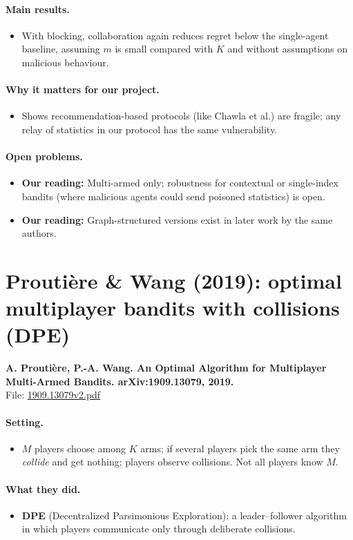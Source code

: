 \documentclass[11pt]{article}
\newcommand{\ours}{\textcolor{orange!80!black}{\textbf{Our reading:}}}
\newcommand{\file}[1]{\url{#1}}
\begin{document}
\paragraph{Main results.}
\begin{itemize}\item With blocking, collaboration again reduces regret below the single-agent baseline, assuming $m$ is small compared with $K$ and without assumptions on malicious behaviour.\end{itemize}
\paragraph{Why it matters for our project.}
\begin{itemize}\item Shows recommendation-based protocols (like Chawla et al.) are fragile; any relay of statistics in our protocol has the same vulnerability.\end{itemize}
\paragraph{Open problems.}
\begin{itemize}\item \ours{} Multi-armed only; robustness for contextual or single-index bandits (where malicious agents could send poisoned statistics) is open.\item \ours{} Graph-structured versions exist in later work by the same authors.\end{itemize}
\section{Proutière \& Wang (2019): optimal multiplayer bandits with collisions (DPE)}
\textbf{A. Proutière, P.-A. Wang. An Optimal Algorithm for Multiplayer Multi-Armed Bandits. arXiv:1909.13079, 2019.}\\ File: \file{1909.13079v2.pdf}
\paragraph{Setting.}
\begin{itemize}\item $M$ players choose among $K$ arms; if several players pick the same arm they \emph{collide} and get nothing; players observe collisions. Not all players know $M$.\end{itemize}
\paragraph{What they did.}
\begin{itemize}\item \textbf{DPE} (Decentralized Parsimonious Exploration): a leader--follower algorithm in which players communicate only through deliberate collisions.\end{itemize}
\end{document}
